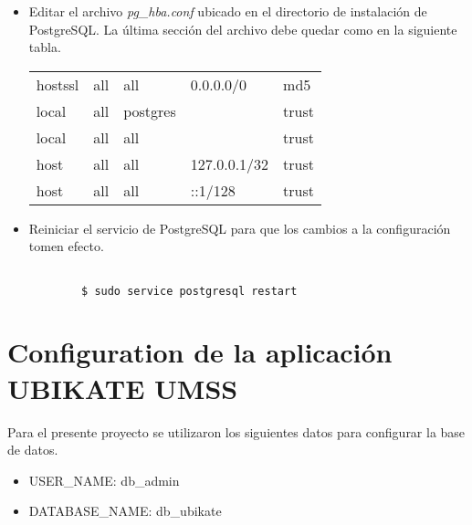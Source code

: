 \begin{itemize}
  \item Editar el archivo \emph{pg\_hba.conf} ubicado en el directorio de instalación de PostgreSQL. La última sección del archivo debe quedar como en la siguiente tabla.

  \begin{center}
    \begin{tabularx}{0.75\textwidth}{ X X X X X}
      \toprule
      hostssl &  all      &       all       &     0.0.0.0/0       &        md5 \\
      local &  all       &      postgres    &                     &       trust \\
      local &  all       &     all         &                      &      trust \\
      host  &  all        &     all        &     127.0.0.1/32      &      trust \\
      host  &  all       &      all        &     ::1/128           &      trust \\
      \bottomrule
    \end{tabularx}
  \end{center}

\item Reiniciar el servicio de PostgreSQL para que los cambios a la configuración tomen efecto.
\begin{center}
  \begin{lstlisting}[label=postgresql_restart,caption=Comando para reiniciar el servicio PostgreSQL.]

        $ sudo service postgresql restart
  \end{lstlisting}
\end{center}


\end{itemize}



\section{Configuration de la aplicación UBIKATE UMSS}

Para el presente proyecto se utilizaron los siguientes datos para configurar la base de datos.

\begin{itemize}
  \item USER\_NAME: db\_admin
  \item DATABASE\_NAME: db\_ubikate
\end{itemize}


